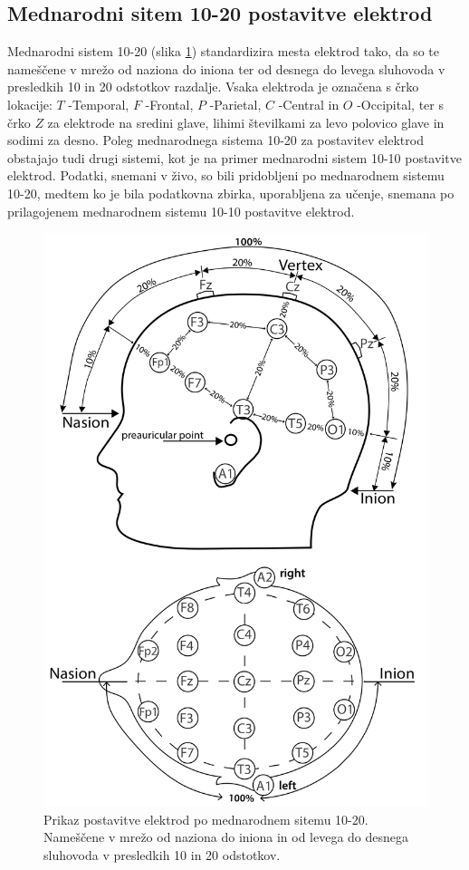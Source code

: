 \subsection{Mednarodni sitem 10-20 postavitve elektrod}
Mednarodni sistem 10-20 (slika \ref{slika:mednarodni_sistem_20}) standardizira mesta elektrod tako, da so te  nameščene v mrežo od naziona do iniona ter od desnega do levega sluhovoda v presledkih 10 in 20 odstotkov razdalje. Vsaka elektroda je označena s črko lokacije: $T$ -Temporal, $F$ -Frontal, $P$ -Parietal, $C$ -Central in $O$ -Occipital, ter s črko $Z$ za elektrode na sredini glave, lihimi številkami za levo polovico glave in sodimi za desno. \cite{klemTentwentyElectrodeSystem1999} Poleg mednarodnega sistema 10-20 za postavitev elektrod obstajajo tudi drugi sistemi, kot je na primer mednarodni sistem 10-10 postavitve elektrod. Podatki, snemani v živo, so bili pridobljeni po mednarodnem sistemu 10-20, medtem ko je bila podatkovna zbirka, uporabljena za učenje, snemana po prilagojenem mednarodnem sistemu 10-10 postavitve elektrod.
\begin{figure}[h]
    \begin{center}
    \includegraphics[width=0.5\linewidth]{slike/1020-diagram1.jpg}
    \end{center}
    \caption[Mednarodni sitem 10-20 postavitve elektrod.]{Prikaz postavitve elektrod po mednarodnem sitemu 10-20. Nameščene v mrežo od naziona do iniona in od levega do desnega sluhovoda v presledkih 10 in 20 odstotkov. \cite{ElectrodeArrangementAccording}}
    \label{slika:mednarodni_sistem_20}
    \end{figure}

